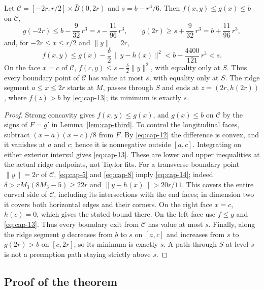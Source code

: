 \begin{lemma}\label{lem:cap-boundary}
Let $\mathcal C=[-2r,r/2]\times\bar B(0,2r)$ and $s=b-r^3/6$. Then $f(x,y)\le g(x)\le b$ on $\mathcal C$,
\begin{equation}\label{eq:cap-13}
g(-2r)\le b-\frac9{32}\,r^3=s-\frac{11}{96}\,r^3,\qquad g(2r)\ge s+\frac9{32}\,r^3=b+\frac{11}{96}\,r^3,
\end{equation}
and, for $-2r\le x\le r/2$ and $\|y\|=2r$,
\begin{equation}\label{eq:cap-14}
f(x,y)\le g(x)-\frac\delta2\,\|y-h(x)\|^2<b-\frac{4400}{121}\,r^3<s .
\end{equation}
On the face $x=c$ of $\mathcal C$, $f(c,y)\le s-\frac\delta2\|y\|^2$, with equality only at $S$. Thus every boundary point of $\mathcal C$ has value at most $s$, with equality only at $S$. The ridge segment $a\le x\le2r$ starts at $M$, passes through $S$ and ends at $z=(2r,h(2r))$, where $f(z)>b$ by \eqref{eq:cap-13}; its minimum is exactly $s$.
\end{lemma}

\begin{proof}
Strong concavity gives $f(x,y)\le g(x)$, and $g(x)\le b$ on $\mathcal C$ by the signs of $F=g'$ in Lemma~\ref{lem:cap-third}. To control the longitudinal faces, subtract $(x-a)(x-c)/8$ from $F$. By \eqref{eq:cap-12} the difference is convex, and it vanishes at $a$ and $c$; hence it is nonnegative outside $[a,c]$. Integrating on either exterior interval gives \eqref{eq:cap-13}. These are lower and upper inequalities at the actual ridge endpoints, not Taylor fits. For a transverse boundary point $\|y\|=2r$ of $\mathcal C$, \eqref{eq:cap-5} and \eqref{eq:cap-8} imply \eqref{eq:cap-14}; indeed $\delta>rM_3(8M_3-5)\ge22r$ and $\|y-h(x)\|>20r/11$. This covers the entire curved side of $\mathcal C$, including its intersections with the end faces; in dimension two it covers both horizontal edges and their corners. On the right face $x=c$, $h(c)=0$, which gives the stated bound there. On the left face use $f\le g$ and \eqref{eq:cap-13}. Thus every boundary exit from $\mathcal C$ has value at most $s$. Finally, along the ridge segment $g$ decreases from $b$ to $s$ on $[a,c]$ and increases from $s$ to $g(2r)>b$ on $[c,2r]$, so its minimum is exactly $s$. A path through $S$ at level $s$ is not a preemption path staying strictly above $s$.
\end{proof}

\subsection{Proof of the theorem}\label{ssec:cap-proof}

